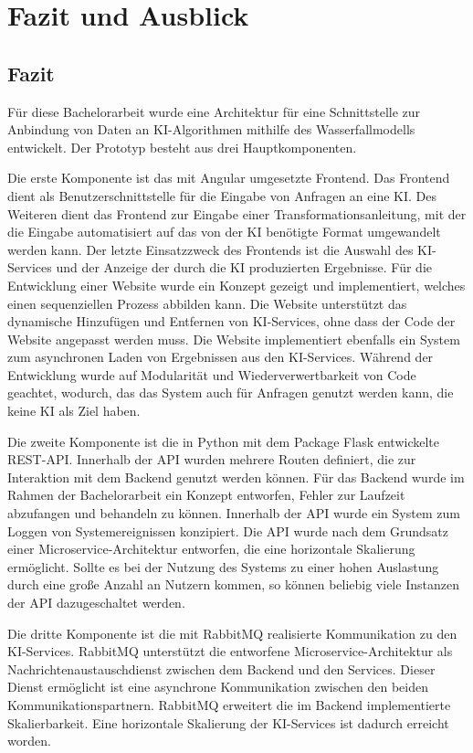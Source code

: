 \section{Fazit und Ausblick}
\subsection{Fazit}
Für diese Bachelorarbeit wurde eine Architektur für eine Schnittstelle zur Anbindung von Daten an KI-Algorithmen mithilfe des Wasserfallmodells  entwickelt. Der Prototyp besteht aus drei Hauptkomponenten. 

Die erste Komponente ist das mit Angular umgesetzte Frontend. Das Frontend dient als Benutzerschnittstelle für die Eingabe von Anfragen an eine KI. Des Weiteren dient das Frontend zur Eingabe einer Transformationsanleitung, mit der die Eingabe automatisiert auf das von der KI benötigte Format umgewandelt werden kann. Der letzte Einsatzzweck des Frontends ist die Auswahl des KI-Services und der Anzeige der durch die KI produzierten Ergebnisse. Für die Entwicklung einer Website wurde ein Konzept gezeigt und implementiert, welches einen sequenziellen Prozess abbilden kann. Die Website unterstützt das dynamische Hinzufügen und Entfernen von KI-Services, ohne dass der Code der Website angepasst werden muss. Die Website implementiert ebenfalls ein System zum asynchronen Laden von Ergebnissen aus den KI-Services. Während der Entwicklung wurde auf Modularität und Wiederverwertbarkeit von Code geachtet, wodurch, das das System auch für Anfragen genutzt werden kann, die keine KI als Ziel haben. 

Die zweite Komponente ist die in Python mit dem Package Flask entwickelte REST-API. Innerhalb der API wurden mehrere Routen definiert, die zur Interaktion mit dem Backend genutzt werden können. Für das Backend wurde im Rahmen der Bachelorarbeit ein Konzept entworfen, Fehler zur Laufzeit abzufangen und behandeln zu können. Innerhalb der API wurde ein System zum Loggen von Systemereignissen konzipiert. Die API wurde nach dem Grundsatz einer Microservice-Architektur entworfen, die eine horizontale Skalierung ermöglicht. Sollte es bei der Nutzung des Systems zu einer hohen Auslastung durch eine große Anzahl an Nutzern kommen, so können beliebig viele Instanzen der API dazugeschaltet werden.

Die dritte Komponente ist die mit RabbitMQ realisierte Kommunikation zu den KI-Services. RabbitMQ unterstützt die entworfene Microservice-Architektur als Nachrichtenaustauschdienst zwischen dem Backend und den Services. Dieser Dienst ermöglicht ist eine asynchrone Kommunikation zwischen den beiden Kommunikationspartnern. RabbitMQ erweitert die im Backend implementierte Skalierbarkeit. Eine horizontale Skalierung der KI-Services ist dadurch erreicht worden.

